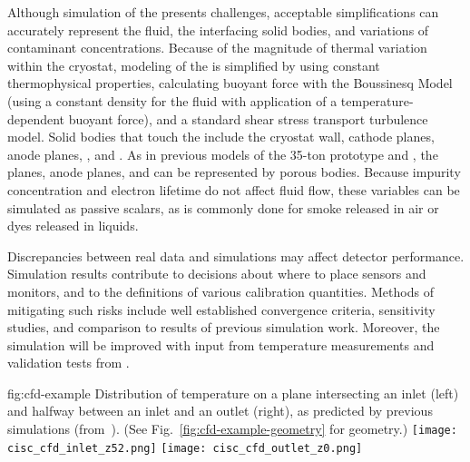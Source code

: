 Although simulation of the  presents challenges, %
acceptable simplifications can %
accurately represent the fluid, the interfacing solid bodies, and variations of contaminant concentrations. Because of the magnitude of thermal variation within the cryostat, modeling of the \lar is simplified by using constant thermophysical properties, calculating buoyant force with the Boussinesq Model (using a constant density for the fluid with application of a temperature-dependent buoyant force), and a standard shear stress transport turbulence model. Solid bodies that touch the \lar include the cryostat wall, cathode planes, anode planes, , and . As in previous  models of the  35-ton prototype and %
\cite{bib:docdb5915}, the  planes, anode planes, and  can be represented by porous bodies. Because impurity concentration and electron lifetime do not affect fluid flow, these variables can be simulated as passive scalars, as is commonly done for smoke released \cite{cfd-1} 
in air or dyes released in liquids.


Discrepancies between real data and simulations may affect detector performance. %
Simulation results contribute to decisions about where to place sensors and monitors, and to %
the definitions of various calibration quantities. Methods of mitigating such risks include well established convergence criteria, sensitivity studies, and comparison to results of previous  simulation work. Moreover, the simulation will be improved with input from temperature measurements and validation tests from . %

\begin{dunefigure}{fig:cfd-example}
  {Distribution of temperature on a plane intersecting an inlet (left) and halfway between an inlet and an outlet (right), as predicted by previous  simulations (from~\cite{bib:docdb5915}). (See Fig.~\ref{fig:cfd-example-geometry} for geometry.)}
  \texttt{[image: cisc\_cfd\_inlet\_z52.png]}
  \texttt{[image: cisc\_cfd\_outlet\_z0.png]}
\end{dunefigure}

